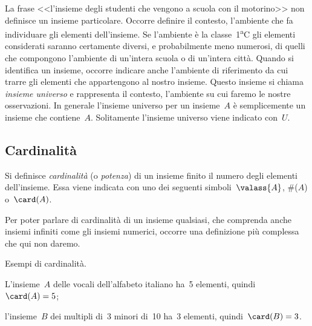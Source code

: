 La frase <<l'insieme degli studenti che vengono a scuola con il motorino>> non definisce un
insieme particolare. Occorre definire il contesto, l'ambiente che fa individuare gli elementi
dell'insieme. Se l'ambiente è la classe~1\textsuperscript{a}C gli elementi considerati saranno certamente diversi, e probabilmente meno numerosi, di quelli che compongono l'ambiente di un'intera scuola o di un'intera
città. Quando si identifica un insieme, occorre indicare anche l'ambiente di riferimento da cui trarre gli elementi che appartengono al nostro insieme. Questo insieme si chiama \emph{insieme universo} e rappresenta il contesto, l'ambiente su cui faremo le nostre osservazioni. In generale l'insieme universo per un insieme~$A$ è semplicemente un insieme che contiene~$A$. Solitamente l'insieme universo viene indicato con~$U$.

\subsection{Cardinalità}

\begin{definizione}
 Si definisce \emph{cardinalità} (o \emph{potenza}) di un insieme finito il numero
degli elementi dell'insieme. Essa viene indicata con uno dei seguenti simboli~$\valass{A}$, \#($A$) o~$\card(A)$.
\end{definizione}

Per poter parlare di cardinalità di un insieme qualsiasi, che
comprenda anche insiemi infiniti come gli insiemi numerici, occorre una
definizione più complessa che qui non daremo.

\begin{exrig}
 \begin{esempio}
 Esempi di cardinalità.
 \begin{enumeratea}
  \item L'insieme~$A$ delle vocali dell'alfabeto italiano ha~5 elementi, quindi~$\card(A)=5$;
  \item l'insieme~$B$ dei multipli di~3 minori di~10 ha~3 elementi, quindi~$\card(B)=3$.
 \end{enumeratea}
 \end{esempio}
\end{exrig}

\ovalbox{\risolvii \ref{ese:5.10}, \ref{ese:5.11}, \ref{ese:5.12}, \ref{ese:5.13}, \ref{ese:5.14}, \ref{ese:5.15}}

\newpage

\cleardoublepage
